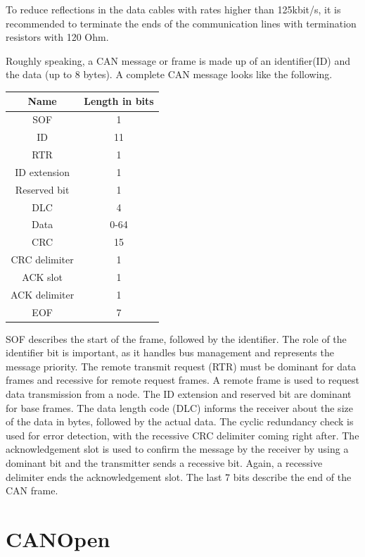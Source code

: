 To reduce reflections in the data cables with rates higher than 125kbit/s, it is recommended to terminate the ends of the communication lines with termination resistors with 120 Ohm. 

\newpage

Roughly speaking, a CAN message or frame is made up of an identifier(ID) and the data (up to 8 bytes). A complete CAN message looks like the following.

\begin{tabular}{|c|c|}
	\hline 
	\textbf{Name} & \textbf{Length in bits} \\ 
	\hline 
	SOF & 1 \\ 
	\hline 
	ID & 11 \\ 
	\hline 
	RTR & 1 \\ 
	\hline 
	ID extension & 1 \\ 
	\hline 
	Reserved bit & 1 \\ 
	\hline 
	DLC & 4 \\ 
	\hline 
	Data & 0-64 \\ 
	\hline 
	CRC & 15 \\ 
	\hline 
	CRC delimiter & 1 \\ 
	\hline 
	ACK slot & 1 \\ 
	\hline 
	ACK delimiter & 1 \\ 
	\hline 
	EOF & 7 \\ 
	\hline 
\end{tabular} 

SOF describes the start of the frame, followed by the identifier. The role of the identifier bit is important, as it handles bus management and represents the message priority. The remote transmit request (RTR) must be dominant for data frames and recessive for remote request frames. A remote frame is used to request data transmission from a node. The ID extension and reserved bit are dominant for base frames. The data length code (DLC) informs the receiver about the size of the data in bytes, followed by the actual data. The cyclic redundancy check is used for error detection, with the recessive CRC delimiter coming right after. The acknowledgement slot is used to confirm the message by the receiver by using a dominant bit and the transmitter sends a recessive bit. Again, a recessive delimiter ends the acknowledgement slot. The last 7 bits describe the end of the CAN frame.

\newpage

\section{CANOpen}

